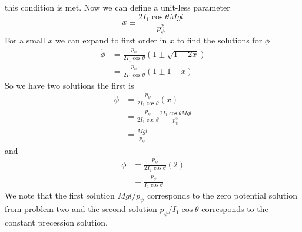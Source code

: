 \documentclass[11pt]{article}
\numberwithin{equation}{section}
\begin{document}
\begin{enumerate}[(a)]
this condition is met. Now we can define a unit-less parameter 
$$x\equiv\frac{2I_1\cos\theta{Mgl}}{p_{\psi}^2}$$
For a small $x$ we can expand to first order in $x$ to find the solutions for $\dot{\phi}$
\begin{align*}
\dot{\phi} &= \frac{p_{\psi}}{2I_1\cos\theta}\left(1\pm\sqrt{1-2x}\right)\\
&= \frac{p_{\psi}}{2I_1\cos\theta}\left(1\pm1-x\right)
\end{align*}
So we have two solutions the first is
\begin{align*}
\dot{\phi} &= \frac{p_{\psi}}{2I_1\cos\theta}\left(x\right)\\
&= \frac{p_{\psi}}{2I_1\cos\theta}\frac{2I_1\cos\theta{Mgl}}{p_{\psi}^2}\\
&= \frac{{Mgl}}{p_{\psi}}
\end{align*}
and
\begin{align*}
\dot{\phi} &= \frac{p_{\psi}}{2I_1\cos\theta}\left(2\right)\\
&= \frac{p_{\psi}}{I_1\cos\theta}
\end{align*}
We note that the first solution $Mgl/p_{\psi}$ corresponds to the zero potential solution 
from problem two and the second solution $p_{\psi}/I_1\cos\theta$ corresponds to the 
constant precession solution.


\end{enumerate}
\end{document}
